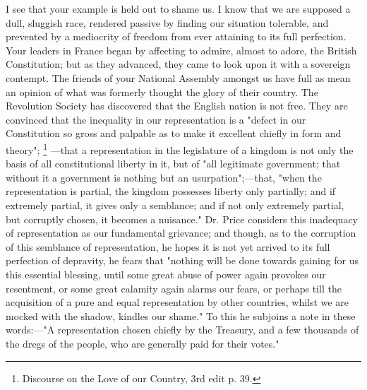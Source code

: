 I see that your example is held out to shame us. I know that we are supposed a dull, sluggish race, rendered passive by finding our situation tolerable, and prevented by a mediocrity of freedom from ever attaining to its full perfection. Your leaders in France began by affecting to admire, almost to adore, the British Constitution; but as they advanced, they came to look upon it with a sovereign contempt. The friends of your National Assembly amongst us have full as mean an opinion of what was formerly thought the glory of their country. The Revolution Society has discovered that the English nation is not free. They are convinced that the inequality in our representation is a "defect in our Constitution so gross and palpable as to make it excellent chiefly in form and theory";
\footnote{ Discourse on the Love of our Country, 3rd edit p. 39.}
—that a representation in the legislature of a kingdom is not only the basis of all constitutional liberty in it, but of "all legitimate government; that without it a government is nothing but an usurpation";—that, "when the representation is partial, the kingdom possesses liberty only partially; and if extremely partial, it gives only a semblance; and if not only extremely partial, but corruptly chosen, it becomes a nuisance." Dr. Price considers this inadequacy of representation as our fundamental grievance; and though, as to the corruption of this semblance of representation, he hopes it is not yet arrived to its full perfection of depravity, he fears that "nothing will be done towards gaining for us this essential blessing, until some great abuse of power again provokes our resentment, or some great calamity again alarms our fears, or perhaps till the acquisition of a pure and equal representation by other countries, whilst we are mocked with the shadow, kindles our shame." To this he subjoins a note in these words:—"A representation chosen chiefly by the Treasury, and a few thousands of the dregs of the people, who are generally paid for their votes."

